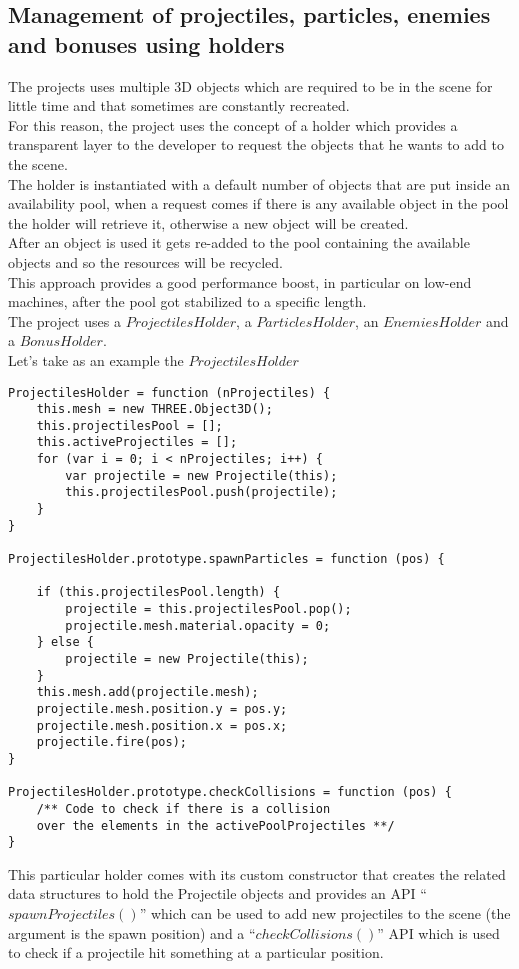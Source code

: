 \documentclass[a4paper,11pt]{article}
\begin{document}
\subsection{Management of projectiles, particles, enemies and bonuses using holders}
The projects uses multiple 3D objects which are required to be in the scene for little time and that sometimes are constantly recreated.\\
For this reason, the project uses the concept of a holder which provides a transparent layer to the developer to request the objects that he wants to add to the scene.\\
The holder is instantiated with a default number of objects that are put inside an availability pool, when a request comes if there is any available object in the pool the holder will retrieve it, otherwise a new object will be created.\\
After an object is used it gets re-added to the pool containing the available objects and so the resources will be recycled.\\
This approach provides a good performance boost, in particular on low-end machines, after the pool got stabilized to a specific length.\\
The project uses a $ProjectilesHolder$, a $ParticlesHolder$, an $EnemiesHolder$ and a $BonusHolder$.\\
Let's take as an example the $ProjectilesHolder$
\begin{verbatim}
ProjectilesHolder = function (nProjectiles) {
    this.mesh = new THREE.Object3D();
    this.projectilesPool = [];
    this.activeProjectiles = [];
    for (var i = 0; i < nProjectiles; i++) {
        var projectile = new Projectile(this);
        this.projectilesPool.push(projectile);
    }
}

ProjectilesHolder.prototype.spawnParticles = function (pos) {

    if (this.projectilesPool.length) {
        projectile = this.projectilesPool.pop();
        projectile.mesh.material.opacity = 0;
    } else {
        projectile = new Projectile(this);
    }
    this.mesh.add(projectile.mesh);
    projectile.mesh.position.y = pos.y;
    projectile.mesh.position.x = pos.x;
    projectile.fire(pos);
}

ProjectilesHolder.prototype.checkCollisions = function (pos) {
    /** Code to check if there is a collision 
    over the elements in the activePoolProjectiles **/
}
\end{verbatim}
This particular holder comes with its custom constructor that creates the related data structures to hold the Projectile objects and provides an API ``$spawnProjectiles()$'' which can be used to add new projectiles to the scene (the argument is the spawn position) and a ``$checkCollisions()$'' API which is used to check if a projectile hit something at a particular position.\\
\end{document}
